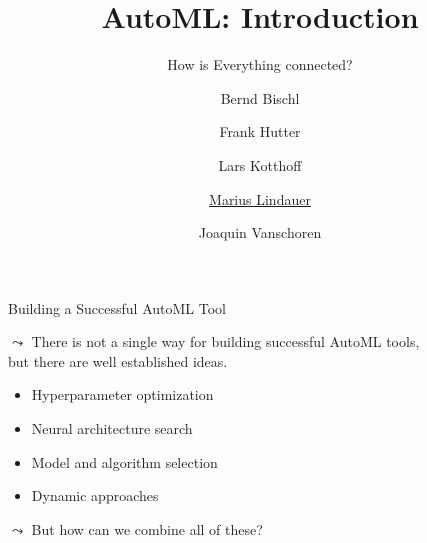 




\title[AutoML: Connections]{AutoML: Introduction}
\subtitle{How is Everything connected?}
\author[Marius Lindauer]{Bernd Bischl \and Frank Hutter \and Lars Kotthoff\newline \and \underline{Marius Lindauer} \and Joaquin Vanschoren}
\institute{}
\date{}





	
	\maketitle
	
	\begin{frame}[c]{Building a Successful AutoML Tool}
		
	 $\leadsto$ There is not a single way for building successful AutoML tools,\\
	 but there are well established ideas.
	 \begin{itemize}
	 	\item Hyperparameter optimization
	 	\item Neural architecture search
	 	\item Model and algorithm selection
	 	\item Dynamic approaches
	 \end{itemize}
	
	$\leadsto$ But how can we combine all of these?
	 		
	\end{frame}
	
